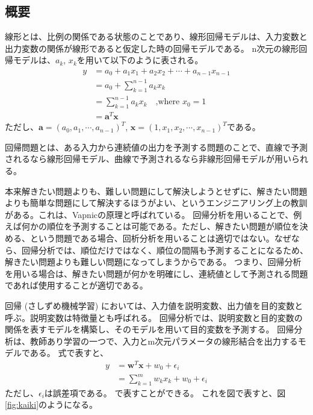 \documentclass{ltjsarticle}
\begin{document}
\subsection{概要}
線形とは、比例の関係である状態のことであり、線形回帰モデルは、入力変数と出力変数の関係が線形であると仮定した時の回帰モデルである。
n次元の線形回帰モデルは、$a_k$, $x_k$を用いて以下のように表される。
\begin{align}
  y &= a_0 + a_1x_1 + a_2x_2 + \cdots + a_{n-1}x_{n-1}\\
  &= a_0 + \sum_{k=1}^{n-1}a_{k} x_{k}\\
  &= \sum_{k=1}^{n-1}a_{k} x_{k} \quad\text{,where $x_0 = 1$}\\
  &= \boldsymbol{a}^T\boldsymbol{x}
\end{align}
ただし、$\boldsymbol{a} = (a_0, a_1, \cdots, a_{n-1})^T$, $\boldsymbol{x} = (1, x_1, x_2, \cdots, x_{n-1})^T$である。
\par
回帰問題とは、ある入力から連続値の出力を予測する問題のことで、直線で予測されるなら線形回帰モデル、曲線で予測されるなら非線形回帰モデルが用いられる。
\par
本来解きたい問題よりも、難しい問題にして解決しようとせずに、解きたい問題よりも簡単な問題にして解決するほうがよい、というエンジニアリング上の教訓がある。これは、Vapnicの原理と呼ばれている。
回帰分析を用いることで、例えば何かの順位を予測することは可能である。ただし、解きたい問題が順位を決める、という問題である場合、回析分析を用いることは適切ではない。なぜなら、回帰分析では、順位だけではなく、順位の間隔も予測することになるため、解きたい問題よりも難しい問題になってしまうからである。
つまり、回帰分析を用いる場合は、解きたい問題が何かを明確にし、連続値として予測される問題であれば使用することが適切である。
\par
回帰 (さしずめ機械学習) においては、入力値を説明変数、出力値を目的変数と呼ぶ。説明変数は特徴量とも呼ばれる。
回帰分析では、説明変数と目的変数の関係を表すモデルを構築し、そのモデルを用いて目的変数を予測する。
回帰分析は、教師あり学習の一つで、入力とm次元パラメータの線形結合を出力するモデルである。
式で表すと、
\begin{align}
  y &= \boldsymbol{w}^T\boldsymbol{x} + w_0 + \epsilon_i\\
  &= \sum_{k=1}^{m}w_{k} x_{k} + w_0 + \epsilon_i
\end{align}
ただし、$\epsilon_i$は誤差項である。
で表すことができる。
これを図で表すと、図\ref{fig:kaiki}のようになる。
\end{document}
